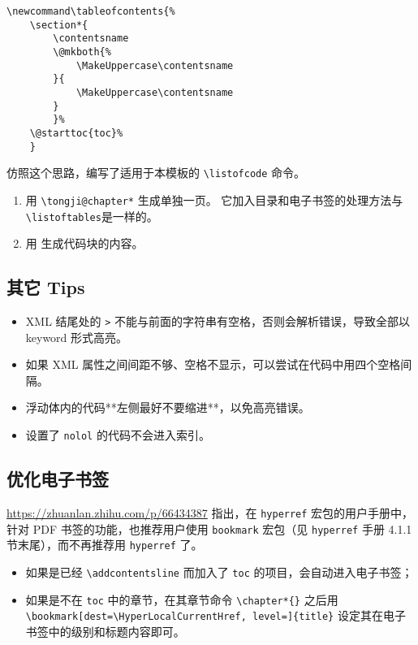 \documentclass[../Main/thesis.tex]{subfiles}
\begin{document}
\begin{lstlisting}[language=TongjiLaTeX,
  caption=目录页的定义,
  style=colorEX]
% tableofcontents 命令原本的命令
\newcommand\tableofcontents{%
    \section*{
        \contentsname
        \@mkboth{%
            \MakeUppercase\contentsname
        }{
            \MakeUppercase\contentsname
        }
        }%
    \@starttoc{toc}%
    }
\end{lstlisting}

仿照这个思路，编写了适用于本模板的 \texttt{\textbackslash listofcode} 命令。
\begin{enumerate}[(1)]
  \item 用 \texttt{\textbackslash tongji@chapter*} 生成单独一页。
  它加入目录和电子书签的处理方法与 \texttt{\textbackslash listoftables}是一样的。
  \item 用 \texttt{} 生成代码块的内容。
\end{enumerate}

\subsection{其它 Tips}
\begin{itemize}[\textbullet]
  \item XML 结尾处的 \texttt{>} 不能与前面的字符串有空格，否则会解析错误，导致全部以 keyword 形式高亮。
  \item 如果 XML 属性之间间距不够、空格不显示，可以尝试在代码中用四个空格间隔。
  \item 浮动体内的代码**左侧最好不要缩进**，以免高亮错误。
  \item 设置了 \texttt{nolol} 的代码不会进入索引。
\end{itemize}

\subsection{优化电子书签}

\url{https://zhuanlan.zhihu.com/p/66434387} 指出，在 \texttt{hyperref}
宏包的用户手册中，针对 PDF 书签的功能，也推荐用户使用 \texttt{bookmark}
宏包（见 \texttt{hyperref} 手册 4.1.1 节末尾），而不再推荐用
\texttt{hyperref} 了。

\begin{itemize}
\item
  如果是已经 \texttt{\textbackslash{}addcontentsline} 而加入了
  \texttt{toc} 的项目，会自动进入电子书签；
\item
  如果是不在 \texttt{toc} 中的章节，在其章节命令
  \texttt{\textbackslash{}chapter*\{\}} 之后用
  \texttt{\textbackslash{}bookmark[dest=\textbackslash{}HyperLocalCurrentHref,\ level=]\{title\}}
  设定其在电子书签中的级别和标题内容即可。
\end{itemize}
\end{document}
